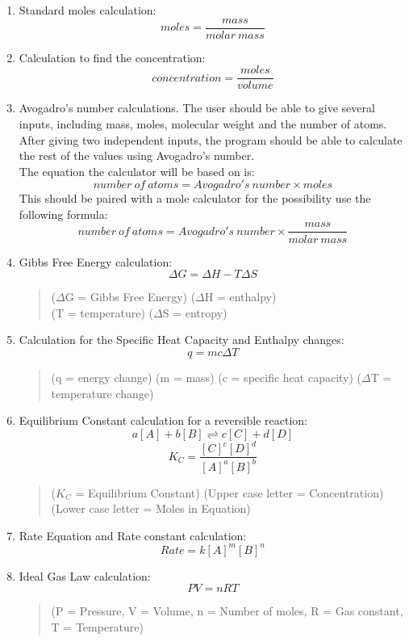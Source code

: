 \documentclass[a4paper,12pt]{article}
\begin{document}
\begin{enumerate}

\item Standard moles calculation:
\[moles=\frac{mass}{molar\: mass}\]

\item Calculation to find the concentration:
\[concentration=\frac{moles}{volume}\]

\newpage

\item Avogadro's number calculations. The user should be able to give several inputs, including mass, moles, molecular weight and the number of atoms. After giving two independent inputs, the program should be able to calculate the rest of the values using Avogadro's number.\\
The equation the calculator will be based on is:
\[number\: of\: atoms = Avogadro's\: number \times moles\]
This should be paired with a mole calculator for the possibility use the following formula:
\[number\: of\: atoms = Avogadro's\: number \times \frac{mass}{molar\: mass}\]

\item Gibbs Free Energy calculation:
\[{\Delta}G = {\Delta}H - T{\Delta}S\]
\begin{quote}
(${\Delta}$G = Gibbs Free Energy) (${\Delta}$H = enthalpy)\\
(T = temperature) (${\Delta}$S = entropy)
\end{quote}

\item Calculation for the Specific Heat Capacity and Enthalpy changes:
\[q = mc {\Delta} T\]
\begin{quote}
(q = energy change) (m = mass) (c = specific heat capacity) (${\Delta}$T = temperature change)
\end{quote}

\item Equilibrium Constant calculation for a reversible reaction:
\[a[A] + b[B] \rightleftharpoons c[C] + d[D]\]
\[K_{C} = \frac{[C]^{c}[D]^{d}}{[A]^{a}[B]^{b}}\]
\begin{quote}
($K_{C}$ = Equilibrium Constant) (Upper case letter = Concentration) (Lower case letter = Moles in Equation)
\end{quote}

\item Rate Equation and Rate constant calculation:
\[Rate = k[A]^{m}[B]^{n}\]

\item Ideal Gas Law calculation:
\[PV = nRT\]
\begin{quote}
(P = Pressure, V = Volume, n = Number of moles, R = Gas constant, T = Temperature)
\end{quote}

\end{enumerate}
\end{document}
